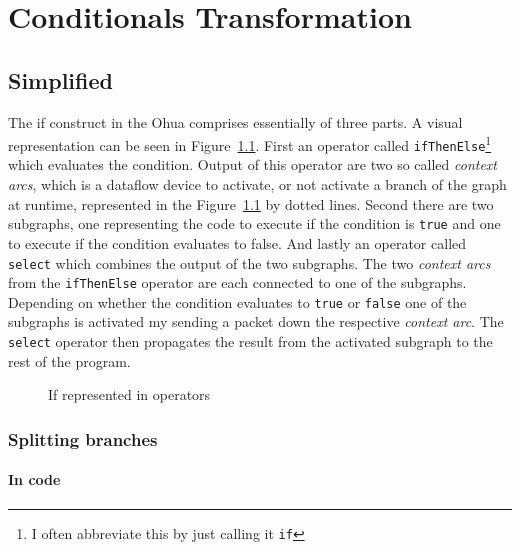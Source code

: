 \chapter{Conditionals Transformation}

\label{ch:if-transformation}

\newcommand{\opite}{\texttt{ifThenElse}}
\newcommand{\opselect}{\texttt{select}}


\section{Simplified}


The if construct in the Ohua comprises essentially of three parts.
A visual representation can be seen in Figure~\ref{fig:if-in-operators}.
First an operator called \texttt{ifThenElse}\footnote{I often abbreviate this by just calling it \texttt{if}} which evaluates the condition.
Output of this operator are two so called \emph{context arcs}, which is a dataflow device to activate, or not activate a branch of the graph at runtime, represented in the Figure~\ref{fig:if-in-operators} by dotted lines.
Second there are two subgraphs, one representing the code to execute if the condition is \texttt{true} and one to execute if the condition evaluates to false.
And lastly an operator called \texttt{select} which combines the output of the two subgraphs.
The two \emph{context arcs} from the \texttt{ifThenElse} operator are each connected to one of the subgraphs.
Depending on whether the condition evaluates to \texttt{true} or \texttt{false} one of the subgraphs is activated my sending a packet down the respective \emph{context arc}.
The \texttt{select} operator then propagates the result from the activated subgraph to the rest of the program.

\begin{figure}
    \caption{If represented in operators}
    \label{fig:if-in-operators}
\end{figure}

\subsection{Splitting branches}

\subsubsection{In code}

